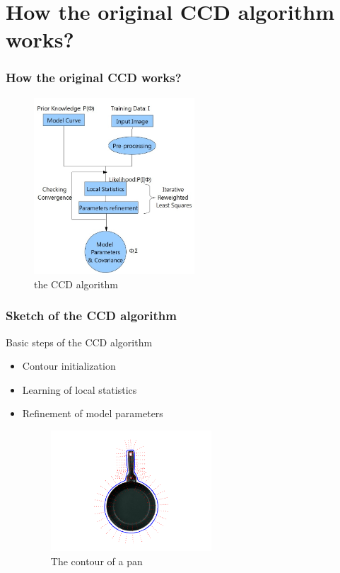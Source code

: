 \documentclass[english,10pt,presentation]{beamer}
\begin{document}
\section{How the original CCD algorithm works?}
\label{sec-2}
\begin{frame}
\frametitle{How the original CCD works?}
\label{sec-2_1}

   \begin{figure}[htb]
   \centering
   \includegraphics[width=6cm,angle=0]{./flowchart.jpg}
   \caption{\label{fig: flowchart}the CCD algorithm}
   \end{figure}
\end{frame}
\begin{frame}
\frametitle{Sketch of the CCD algorithm}
\label{sec-2_2}
\begin{exampleblock}{Basic steps of the CCD algorithm}
\label{sec-2_2_1}
\begin{itemize}

\item Contour initialization\\
\label{sec-2_2_1_1}%
\item Learning of local statistics\\
\label{sec-2_2_1_2}%
\item Refinement of model parameters\\
\label{sec-2_2_1_3}%
\begin{figure}[htb]
     \centering
     \includegraphics[width=6cm,angle=0]{./pan_contour.jpg}
     \caption{\label{fig:contour}The contour of a pan}
     \end{figure}
\end{itemize} %
\end{exampleblock}
\end{frame}
\end{document}
